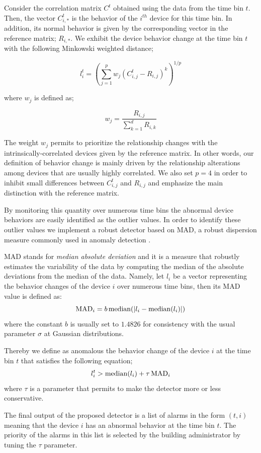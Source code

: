 Consider the correlation matrix $C^t$ obtained using the data from the time bin $t$.
Then, the vector $C^t_{i,*}$ is the behavior of the $i^{th}$ device for this time bin.
In addition, its normal behavior is given by the corresponding vector in the reference matrix; $R_{i,*}$.
We exhibit the device behavior change at the time bin $t$ with the following Minkowski weighted distance;

\[ l^t_{i} = \left(\sum_{j=1}^p  w_j\left(C^t_{i,j} - R_{i,j}\right)^k\right)^{1/p} \]

where $w_j$ is defined as;

\[ w_j = \frac{R_{i,j}}{\sum_{k=1}^d R_{i,k}} \]

The weight $w_j$ permits to prioritize the relationship changes with the intrinsically-correlated devices given by the reference matrix.
In other words, our definition of behavior change is mainly driven by the relationship alterations among devices that are usually highly correlated.
We also set $p=4$ in order to inhibit small differences between $C^t_{i,j}$ and $R_{i,j}$ and emphasize the main distinction with the reference matrix.

By monitoring this quantity over numerous time bins the abnormal device behaviors are easily identified as the outlier values.
In order to identify these outlier values we implement a robust detector based on MAD, a robust dispersion measure commonly used in anomaly detection \cite{huber:wiley2009,chan:springer2005}.

MAD stands for \emph{median absolute deviation} and it is a measure that robustly estimates the variability of the data by computing the median of the absolute deviations from the median of the data.
Namely, let $l_{i}$ be a vector representing the behavior changes of the device $i$ over numerous time bins, then its MAD value is defined as:
\[ \operatorname{MAD}_i = b \operatorname{median}(\lvert l_{i} - \operatorname{median}(l_{i})\rvert)\]
where the constant $b$ is usually set to $1.4826$ for consistency with the usual parameter $\sigma$ at Gaussian distributions.

Thereby we define as anomalous the behavior change of the device $i$ at the time bin $t$ that satisfies the following equation;
\[l^t_{i} > \operatorname{median}(l_{i}) + \tau  \operatorname{MAD}_i\]
where $\tau$ is a parameter that permits to make the detector more or less conservative.

The final output of the proposed detector is a list of alarms in the form $(t,i)$ meaning that the device $i$ has an abnormal behavior at the time bin $t$.
The priority of the alarms in this list is selected by the building administrator by tuning the $\tau$ parameter.
